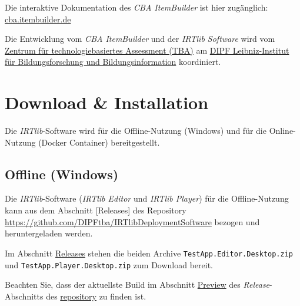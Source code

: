 \documentclass[
  letterpaper,
  DIV=11]{scrreprt}
\begin{document}
Die interaktive Dokumentation des \emph{CBA ItemBuilder} ist hier
zugänglich: \href{https://cba.itembuilder.de}{cba.itembuilder.de}

Die Entwicklung vom \emph{CBA ItemBuilder} und der \emph{IRTlib
Software} wird vom \href{https://tba.dipf.de/de/ueber-tba/}{Zentrum für
technologiebasiertes Assessment (TBA)} am
\href{https://www.dipf.de/}{DIPF \textbar{} Leibniz-Institut für
Bildungsforschung und Bildungsinformation} koordiniert.


\hypertarget{download-installation}{%
\chapter{Download \& Installation}\label{download-installation}}

\let\clearpage\standardclearpage

Die \emph{IRTlib}-Software wird für die Offline-Nutzung (Windows) und
für die Online-Nutzung (Docker Container) bereitgestellt.

\hypertarget{offline-windows}{%
\section{Offline (Windows)}\label{offline-windows}}

Die \emph{IRTlib}-Software (\emph{IRTlib Editor} und \emph{IRTlib
Player}) für die Offline-Nutzung kann aus dem Abschnitt {[}Releases{]}
des Repository \url{https://github.com/DIPFtba/IRTlibDeploymentSoftware}
bezogen und heruntergeladen werden.

Im Abschnitt
\href{https://github.com/DIPFtba/IRTlibDeploymentSoftware/releases}{Releases}
stehen die beiden Archive \texttt{TestApp.Editor.Desktop.zip} und
\texttt{TestApp.Player.Desktop.zip} zum Download bereit.

\begin{tcolorbox}[enhanced jigsaw, colbacktitle=quarto-callout-note-color!10!white, coltitle=black, colframe=quarto-callout-note-color-frame, leftrule=.75mm, breakable, opacitybacktitle=0.6, toprule=.15mm, title=\textcolor{quarto-callout-note-color}{\faInfo}\hspace{0.5em}{Hinweis}, colback=white, titlerule=0mm, arc=.35mm, bottomtitle=1mm, toptitle=1mm, rightrule=.15mm, bottomrule=.15mm, left=2mm, opacityback=0]

Beachten Sie, dass der aktuellste Build im Abschnitt
\href{https://github.com/DIPFtba/IRTlibDeploymentSoftware/releases/tag/preview-231025}{Preview}
des \emph{Release}-Abschnitts des
\href{https://github.com/DIPFtba/IRTlibDeploymentSoftware/releases}{repository}
zu finden ist.

\end{tcolorbox}
\end{document}
